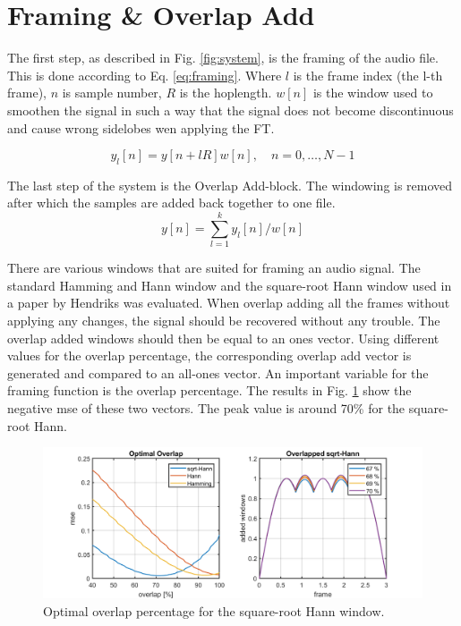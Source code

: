 \section{Framing \& Overlap Add} \label{sec:framing_overlap_add}

The first step, as described in Fig. \ref{fig:system}, is the framing of the audio file. This is done according to Eq. \ref{eq:framing}. Where $l$ is the frame index (the l-th frame), $n$ is sample number, $R$ is the hoplength. $w[n]$ is the window used to smoothen the signal in such a way that the signal does not become discontinuous and cause wrong sidelobes wen applying the FT.

\begin{equation}
  \label{eq:framing}
  y_{l}[n] = y[n + lR]w[n],\quad n=0,\hdots,N-1
\end{equation}

The last step of the system is the Overlap Add-block. The windowing is removed after which the samples are added back together to one file.
\begin{equation}
  \label{eq:overlap_add}
  y[n] =  \sum_{l=1}^{k} y_{l}[n]/w[n]
\end{equation}

There are various windows that are suited for framing an audio signal. The standard Hamming and Hann window and the square-root Hann window used in a paper by Hendriks\cite{Hendriks} was evaluated. When overlap adding all the frames without applying any changes, the signal should be recovered without any trouble. The overlap added windows should then be equal to an ones vector. Using different values for the overlap percentage, the corresponding overlap add vector is generated and compared to an all-ones vector. An important variable for the framing function is the overlap percentage.  The results in Fig. \ref{fig:opt_oa} show the negative mse of these two vectors. The peak value is around 70\% for the square-root Hann.

\begin{figure}[h]
  \includegraphics[width=\textwidth]{images/optimal_overlap.png}
  \caption{Optimal overlap percentage for the square-root Hann window.}
  \label{fig:opt_oa}
\end{figure}
